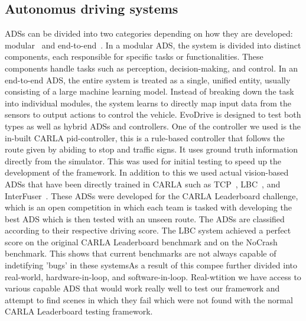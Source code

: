 \documentclass[a4paper, 10pt, conference]{ieeeconf}
\begin{document}
\subsection{Autonomus driving systems}
ADSs can be divided into two categories depending on how they are developed: modular~\cite{kato2018autoware} and end-to-end~\cite{chen2020learning}. In a modular ADS, the system is divided into distinct components, each responsible for specific tasks or functionalities. These components handle tasks such as perception, decision-making, and control. In an end-to-end ADS, the entire system is treated as a single, unified entity, usually consisting of a large machine learning model. Instead of breaking down the task into individual modules, the system learns to directly map input data from the sensors to output actions to control the vehicle. EvoDrive is designed to test both types as well as hybrid ADSs and controllers. One of the controller we used is the in-built CARLA pid-controller, this is a rule-based controller that follows the route given by abiding to stop and traffic signs. It uses ground truth information directly from the simulator. This was used for initial testing to speed up the development of the framework.
In addition to this we used actual vision-based ADSs that have been directly trained in CARLA such as TCP~\cite{wu2022trajectory}, LBC~\cite{chen2020learning}, and InterFuser~\cite{shao2023safety}. These ADSs were developed for the CARLA Leaderboard challenge, which is an open competition in which each team is tasked with developing the best ADS which is then tested with an unseen route. The ADSs are classified according to their respective driving score. The LBC system achieved a perfect score on the original CARLA Leaderboard benchmark and on the NoCrash benchmark. This shows that current benchmarks are not always capable of indetifying 'bugs' in these systemsAs a result of this compee further divided into real-world, hardware-in-loop, and software-in-loop. Real-wtition we have access to various capable ADS that would work really well to test our framework and attempt to find scenes in which they fail which were not found with the normal CARLA Leaderboard testing framework.
\end{document}
